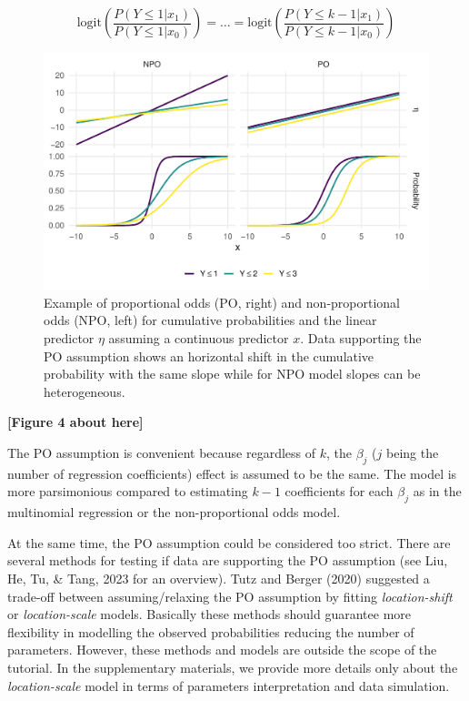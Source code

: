 \documentclass[
  man, mask,floatsintext]{apa6}
\begin{document}
\begin{equation}
\text{logit} (\frac{P(Y \leq 1 |x_1)}{P(Y \leq 1 |x_0)}) = \dots = \text{logit} (\frac{P(Y \leq k - 1 |x_1)}{P(Y \leq k -1 |x_0)})
\label{eq:prop-odds}
\end{equation}

\scriptsize

\begin{figure}

{\centering \includegraphics[width=1\linewidth]{paper_files/figure-latex/fig-prop-odds-1} 

}

\caption{Example of proportional odds (PO, right) and non-proportional odds (NPO, left) for cumulative probabilities and the linear predictor \(\eta\) assuming a continuous predictor \(x\). Data supporting the PO assumption shows an horizontal shift in the cumulative probability with the same slope while for NPO model slopes can be heterogeneous.}\label{fig:fig-prop-odds}
\end{figure}

\begin{center}\textbf{[Figure 4 about here]} \end{center}

\normalsize

The PO assumption is convenient because regardless of \(k\), the \(\beta_j\) (\(j\) being the number of regression coefficients) effect is assumed to be the same. The model is more parsimonious compared to estimating \(k - 1\) coefficients for each \(\beta_j\) as in the multinomial regression or the non-proportional odds model.

At the same time, the PO assumption could be considered too strict. There are several methods for testing if data are supporting the PO assumption (see Liu, He, Tu, \& Tang, 2023 for an overview). Tutz and Berger (2020) suggested a trade-off between assuming/relaxing the PO assumption by fitting \emph{location-shift} or \emph{location-scale} models. Basically these methods should guarantee more flexibility in modelling the observed probabilities reducing the number of parameters. However, these methods and models are outside the scope of the tutorial. In the supplementary materials, we provide more details only about the \emph{location-scale} model in terms of parameters interpretation and data simulation.
\end{document}
